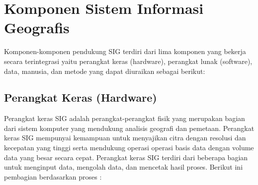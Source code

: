 \section{Komponen Sistem Informasi Geografis}
Komponen-komponen pendukung SIG terdiri dari lima komponen yang bekerja secara terintegrasi yaitu perangkat keras (hardware), perangkat lunak (software), data, manusia, dan metode yang dapat diuraikan sebagai berikut:

\subsection{ Perangkat Keras (Hardware)}
 Perangkat keras SIG adalah perangkat-perangkat fisik yang merupakan bagian dari sistem komputer yang mendukung analisis geografi dan pemetaan. Perangkat keras SIG mempunyai kemampuan untuk menyajikan citra dengan resolusi dan kecepatan yang tinggi serta mendukung operasi operasi basis data dengan volume data yang besar secara cepat. Perangkat keras SIG terdiri dari beberapa bagian untuk menginput data, mengolah data, dan mencetak hasil proses. Berikut ini pembagian berdasarkan proses :

